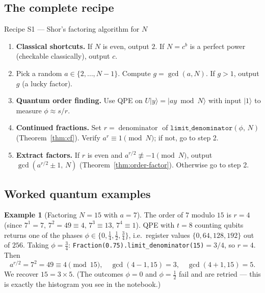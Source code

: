 \documentclass[11pt]{article}
\theoremstyle{plain}
\theoremstyle{definition}
\newtheorem{example}[theorem]{Example}
\theoremstyle{remark}
\newcommand{\ket}[1]{\lvert #1 \rangle}
\begin{document}
\subsection{The complete recipe}

\begin{recipebox}{Recipe S1 --- Shor's factoring algorithm for $N$}
\begin{enumerate}[leftmargin=2.2em,itemsep=1pt,topsep=3pt]
  \item \textbf{Classical shortcuts.} If $N$ is even, output $2$. If $N=c^{b}$ is a perfect
        power (checkable classically), output $c$.
  \item Pick a random $a\in\{2,\dots,N-1\}$. Compute $g=\gcd(a,N)$.
        If $g>1$, output $g$ (a lucky factor).
  \item \textbf{Quantum order finding.} Use QPE on $U\ket{y}=\ket{ay\bmod N}$ with input
        $\ket{1}$ to measure $\phi\approx s/r$.
  \item \textbf{Continued fractions.} Set $r=\operatorname{denominator}$ of
        $\texttt{limit\_denominator}(\phi,\,N)$ (Theorem~\ref{thm:cf}).
        Verify $a^{r}\equiv 1 \pmod N$; if not, go to step 2.
  \item \textbf{Extract factors.} If $r$ is even and $a^{r/2}\not\equiv -1 \pmod N$, output
        $\gcd(a^{r/2}\pm1,\,N)$ (Theorem~\ref{thm:order-factor}). Otherwise go to step 2.
\end{enumerate}
\end{recipebox}

\subsection{Worked quantum examples}

\begin{example}[Factoring $N=15$ with $a=7$]\label{ex:15}
The order of $7$ modulo $15$ is $r=4$ (since $7^{1}=7,\,7^{2}=49\equiv4,\,7^{3}\equiv13,\,
7^{4}\equiv1$). QPE with $t=8$ counting qubits returns one of the phases
$\phi\in\{0,\tfrac14,\tfrac12,\tfrac34\}$, i.e.\ register values $\{0,64,128,192\}$ out of
$256$. Taking $\phi=\tfrac34$: \verb|Fraction(0.75).limit_denominator(15)|$=3/4$, so $r=4$.
Then
\[
  a^{r/2}=7^{2}=49\equiv 4 \pmod{15},\quad
  \gcd(4-1,15)=3,\quad \gcd(4+1,15)=5.
\]
We recover $15 = 3\times 5$. (The outcomes $\phi=0$ and $\phi=\tfrac12$ fail and are
retried --- this is exactly the histogram you see in the notebook.)
\end{example}
\end{document}
